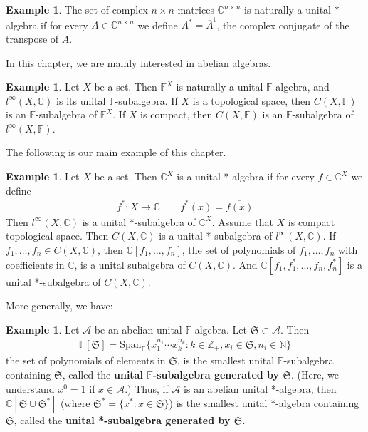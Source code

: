 \documentclass[12pt,b5paper,notitlepage]{article}
\theoremstyle{definition}
\newtheorem{eg}[df]{Example}
\theoremstyle{plain}
\newcommand{\fk}{\mathfrak}
\newcommand{\ovl}{\overline}
\newcommand{\tr}{\mathrm{t}} %
\newcommand{\Span}{\mathrm{Span}}
\newcommand{\scr}{\mathscr}
\newcommand{\Cbb}{\mathbb C}
\newcommand{\Nbb}{\mathbb N}
\newcommand{\Zbb}{\mathbb Z}
\newcommand{\Fbb}{\mathbb F}
\numberwithin{equation}{section}
\begin{document}
\begin{eg}
The set of complex $n\times n$ matrices $\Cbb^{n\times n}$ is naturally a unital $*$-algebra if for every $A\in\Cbb^{n\times n}$ we define $A^*=\ovl A^\tr$, the complex conjugate of the transpose of $A$.
\end{eg}

In this chapter, we are mainly interested in abelian algebras.

\begin{eg}
Let $X$ be a set. Then $\Fbb^X$ is naturally a unital $\Fbb$-algebra, and $l^\infty(X,\Cbb)$ is its unital $\Fbb$-subalgebra. If $X$ is a topological space, then $C(X,\Fbb)$ is an $\Fbb$-subalgebra of $\Fbb^X$. If $X$ is compact, then $C(X,\Fbb)$ is an $\Fbb$-subalgebra of $l^\infty(X,\Fbb)$.
\end{eg}



The following is our main example of this chapter.
\begin{eg}
Let $X$ be a set. Then $\Cbb^X$ is a unital *-algebra if for every $f\in\Cbb^X$ we define \index{f@$f^*(x)=\ovl{f(x)}$}
\begin{align}
f^*:X\rightarrow\Cbb\qquad f^*(x)=\ovl{f(x)}
\end{align}
Then $l^\infty(X,\Cbb)$ is a unital *-subalgebra of $\Cbb^X$. Assume that $X$ is compact topological space. Then $C(X,\Cbb)$ is a unital *-subalgebra of $l^\infty(X,\Cbb)$. If $f_1,\dots,f_n\in C(X,\Cbb)$, then $\Cbb[f_1,\dots,f_n]$, the set of polynomials of $f_1,\dots,f_n$ with coefficients in $\Cbb$, is a unital subalgebra of $C(X,\Cbb)$. And $\Cbb[f_1,f_1^*,\dots,f_n,f_n^*]$ is a unital *-subalgebra of $C(X,\Cbb)$.
\end{eg}


More generally, we have:

\begin{eg}
Let $\scr A$ be an abelian unital $\Fbb$-algebra. Let $\fk S\subset\scr A$. Then \index{FS@$\Fbb[\fk S]$}
\begin{align}
\Fbb[\fk S]=\Span_\Fbb\{x_1^{n_1}\cdots x_k^{n_k}:k\in\Zbb_+,x_i\in\fk S,n_i\in\Nbb\}
\end{align}
the set of polynomials of elements in $\fk S$, is the smallest unital $\Fbb$-subalgebra containing $\fk S$, called the \textbf{unital $\Fbb$-subalgebra generated by $\fk S$}.  (Here, we understand $x^0=1$ if $x\in\scr A$.) Thus, if $\scr A$ is an abelian unital *-algebra, then $\Cbb[\fk S\cup\fk S^*]$ (where $\fk S^*=\{x^*:x\in\fk S\}$) is the smallest unital *-algebra containing $\fk S$, called the \textbf{unital *-subalgebra generated by $\fk S$}.
\end{eg}
\end{document}
